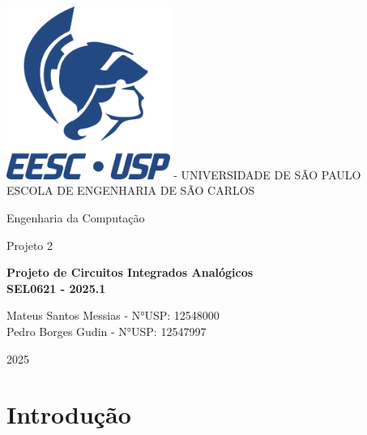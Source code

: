 \documentclass[12pt,a4paper]{article}
\newcommand{\imprimirMateria}{Projeto de Circuitos Integrados Analógicos}
\newcommand{\imprimirCodMateria}{SEL0621}
\newcommand{\imprimirTitulo}{Projeto 2}
\newcommand{\imprimirSubtitulo}{Engenharia da Computação}
\newcommand{\imprimirAutores}{Mateus Santos Messias - N°USP: 12548000 \\ Pedro Borges Gudin - N°USP: 12547997}
\newcommand{\imprimirAno}{2025}
\begin{document}
\hypersetup{pageanchor=false}
\begin{titlepage}
    \begin{center}
        \vspace*{0.5cm}
        \includegraphics[width=0.4\textwidth]{images/Logo EESC-USP - Vertical Monocromatico Azul (ECM).png}
        -    
        \Large
        \vfill
        UNIVERSIDADE DE SÃO PAULO\\
        ESCOLA DE ENGENHARIA DE SÃO CARLOS\\
        \vspace{0.5cm}
        {\Large \imprimirSubtitulo \par}
        \vspace{1cm}
        
        {\Huge \imprimirTitulo \par}
        \vspace{1cm}
        \LARGE
        \textbf{
            \imprimirMateria{}\\
            \imprimirCodMateria{} - \imprimirAno.1
        }
        
        \vspace{3.5cm}
        
        {\large \imprimirAutores \par}
         \vfill
        
        \vspace{2cm}
        
        {\large \imprimirAno \par}
     \end{center}
\end{titlepage}
\newpage

\hypersetup{pageanchor=true}
\tableofcontents
\newpage

\section*{Introdução}
\end{document}
